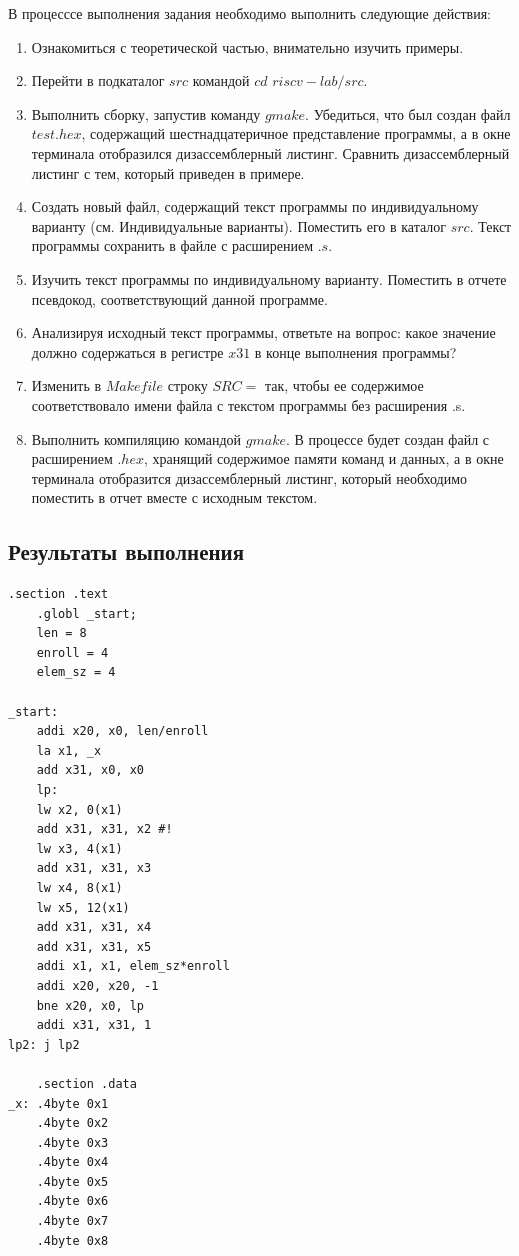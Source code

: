 В процесссе выполнения задания необходимо выполнить следующие действия:
\begin{enumerate}
	\item Ознакомиться с теоретической частью, внимательно изучить примеры.
	\item Перейти в подкаталог $src$ командой $cd$ $riscv-lab/src$.
	\item Выполнить сборку, запустив команду $gmake$. Убедиться, что был создан файл $test.hex$, содержащий шестнадцатеричное представление программы, а в окне терминала отобразился дизассемблерный листинг. Сравнить дизассемблерный листинг с тем, который приведен в примере.
	\item Создать новый файл, содержащий текст программы по индивидуальному варианту (см. Индивидуальные варианты). Поместить его в каталог $src$. Текст программы сохранить в файле с расширением $.s$.
	\item Изучить текст программы по индивидуальному варианту. Поместить в отчете псевдокод, соответствующий данной программе.
	\item Анализируя исходный текст программы, ответьте на вопрос: какое значение должно содержаться в регистре $x31$ в конце выполнения программы?
	\item Изменить в $Makefile$ строку $SRC=$ так, чтобы ее содержимое соответствовало имени файла с текстом программы без расширения .s.
	\item Выполнить компиляцию командой $gmake$. В процессе будет создан файл с расширением $.hex$, хранящий содержимое памяти команд и данных, а в окне терминала отобразится дизассемблерный листинг, который необходимо поместить в отчет вместе с исходным текстом.
\end{enumerate}

\subsection*{Результаты выполнения}

\begin{lstlisting}[label=lst:v11,caption=Код программы варианта]
	.section .text
	.globl _start;
	len = 8 
	enroll = 4
	elem_sz = 4 
	
_start:
	addi x20, x0, len/enroll
	la x1, _x
	add x31, x0, x0
	lp:
	lw x2, 0(x1)
	add x31, x31, x2 #!
	lw x3, 4(x1)
	add x31, x31, x3
	lw x4, 8(x1)
	lw x5, 12(x1)
	add x31, x31, x4
	add x31, x31, x5
	addi x1, x1, elem_sz*enroll
	addi x20, x20, -1
	bne x20, x0, lp
	addi x31, x31, 1
lp2: j lp2
	
	.section .data
_x: .4byte 0x1
	.4byte 0x2
	.4byte 0x3
	.4byte 0x4
	.4byte 0x5
	.4byte 0x6
	.4byte 0x7
	.4byte 0x8
\end{lstlisting}

